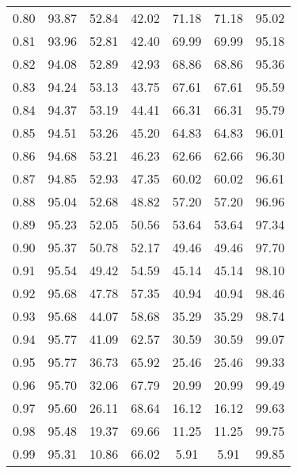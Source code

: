 \begin{tabular}{|c|c|c|c|c|c|c|}
      0.80 &     93.87 &     52.84 &      42.02 &   71.18 &      71.18 &         95.02 \\
      0.81 &     93.96 &     52.81 &      42.40 &   69.99 &      69.99 &         95.18 \\
      0.82 &     94.08 &     52.89 &      42.93 &   68.86 &      68.86 &         95.36 \\
      0.83 &     94.24 &     53.13 &      43.75 &   67.61 &      67.61 &         95.59 \\
      0.84 &     94.37 &     53.19 &      44.41 &   66.31 &      66.31 &         95.79 \\
      0.85 &     94.51 &     53.26 &      45.20 &   64.83 &      64.83 &         96.01 \\
      0.86 &     94.68 &     53.21 &      46.23 &   62.66 &      62.66 &         96.30 \\
      0.87 &     94.85 &     52.93 &      47.35 &   60.02 &      60.02 &         96.61 \\
      0.88 &     95.04 &     52.68 &      48.82 &   57.20 &      57.20 &         96.96 \\
      0.89 &     95.23 &     52.05 &      50.56 &   53.64 &      53.64 &         97.34 \\
      0.90 &     95.37 &     50.78 &      52.17 &   49.46 &      49.46 &         97.70 \\
      0.91 &     95.54 &     49.42 &      54.59 &   45.14 &      45.14 &         98.10 \\
      0.92 &     95.68 &     47.78 &      57.35 &   40.94 &      40.94 &         98.46 \\
      0.93 &     95.68 &     44.07 &      58.68 &   35.29 &      35.29 &         98.74 \\
      0.94 &     95.77 &     41.09 &      62.57 &   30.59 &      30.59 &         99.07 \\
      0.95 &     95.77 &     36.73 &      65.92 &   25.46 &      25.46 &         99.33 \\
      0.96 &     95.70 &     32.06 &      67.79 &   20.99 &      20.99 &         99.49 \\
      0.97 &     95.60 &     26.11 &      68.64 &   16.12 &      16.12 &         99.63 \\
      0.98 &     95.48 &     19.37 &      69.66 &   11.25 &      11.25 &         99.75 \\
      0.99 &     95.31 &     10.86 &      66.02 &    5.91 &       5.91 &         99.85 \\
\bottomrule
\end{tabular}
